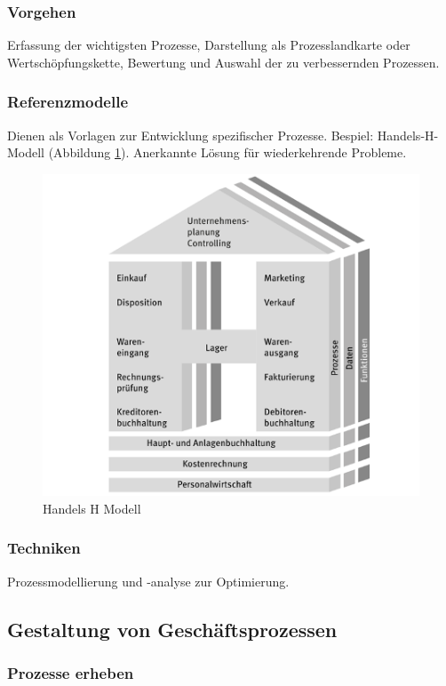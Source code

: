     \subsubsection*{Vorgehen}
        Erfassung der wichtigsten Prozesse, Darstellung als Prozesslandkarte oder Wertschöpfungskette, Bewertung und Auswahl der zu verbessernden Prozessen.
    \subsubsection*{Referenzmodelle}
        Dienen als Vorlagen zur Entwicklung spezifischer Prozesse. Bespiel: Handels-H-Modell (Abbildung \ref{fig:Handels-H-Modell}). Anerkannte Lösung für wiederkehrende Probleme.
        \begin{figure}[h]
            \centering
            \includegraphics[width=\textwidth]{image/Handels-H-Modell.png}
            \caption{Handels H Modell}
            \label{fig:Handels-H-Modell}
        \end{figure}
    \subsubsection*{Techniken}
        Prozessmodellierung und -analyse zur Optimierung.

\subsection{Gestaltung von Geschäftsprozessen}
    \subsubsection{Prozesse erheben}
